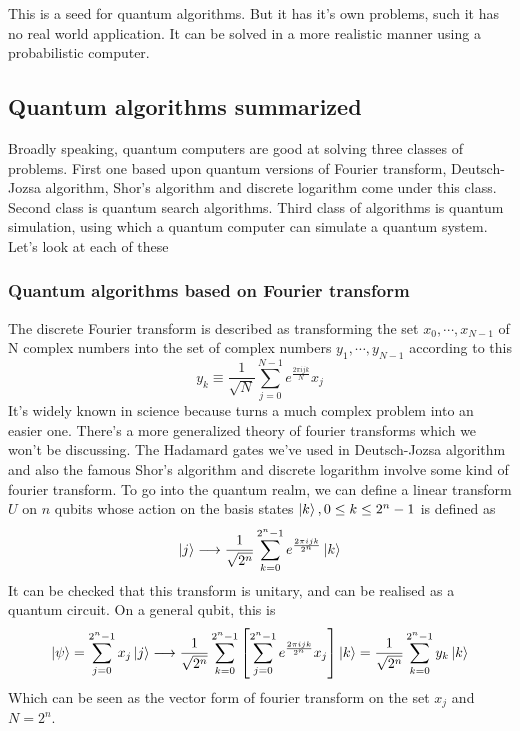 This is a seed for quantum algorithms. But it has it's own problems, such it has no real world application. It can be solved in a more realistic manner using a probabilistic computer.

\subsection{Quantum algorithms summarized}
Broadly speaking, quantum computers are good at solving three classes of problems. First one based upon quantum versions of Fourier transform, Deutsch-Jozsa algorithm, Shor's algorithm and discrete logarithm come under this class. Second class is quantum search algorithms. Third class of algorithms is quantum simulation, using which a quantum computer can simulate a quantum system. Let's look at each of these
\subsubsection{Quantum algorithms based on Fourier transform}
The discrete Fourier transform is described as transforming the set $x_0, \cdots, x_{N-1}$ of N complex numbers into the set of complex numbers $y_1,\cdots,y_{N-1}$ according to this
\begin{equation}
    y_k \equiv \frac{1}{\sqrt{N}}\sum_{j=0}^{N-1} e^{\frac{2\pi ijk}{N}}x_j 
\end{equation}
It's widely known in science because turns a much complex problem into an easier one. There's a more generalized theory of fourier transforms which we won't be discussing. The Hadamard gates we've used in Deutsch-Jozsa algorithm and also the famous Shor's algorithm and discrete logarithm involve some kind of fourier transform. To go into the quantum realm, we can define a linear transform $U$ on $n$ qubits whose action on the basis states $\ket{k}, 0 \leq k \leq 2^n - 1$ is defined as
\begin{equation}
    \ket{j } \longrightarrow \frac{1}{\sqrt{2^n}}\sum_{k=0}^{2^n-1}e^{\frac{2\pi ijk}{2^n}}\ket{k}
\end{equation}
It can be checked that this transform is unitary, and can be realised as a quantum circuit. On a general qubit, this is
\begin{equation}
    \ket{\psi} = \sum_{j=0}^{2^n-1} x_j\ket{j} \longrightarrow \frac{1}{\sqrt{2^n}}\sum_{k=0}^{2^n-1}\left[\sum_{j=0}^{2^n-1}e^{\frac{2\pi ijk}{2^n}}x_j\right]\ket{k}
    = \frac{1}{\sqrt{2^n}}\sum_{k=0}^{2^n-1} y_k \ket{k}
\end{equation}
Which can be seen as the vector form of fourier transform on the set $x_j$ and $N=2^n$. 

